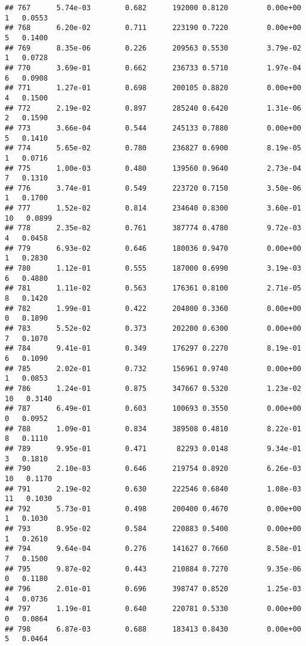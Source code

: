 \documentclass[
]{article}
\begin{document}
\begin{verbatim}
## 767      5.74e-03        0.682      192000 0.8120         0.00e+00   1   0.0553
## 768      6.20e-02        0.711      223190 0.7220         0.00e+00   5   0.1400
## 769      8.35e-06        0.226      209563 0.5530         3.79e-02   1   0.0728
## 770      3.69e-01        0.662      236733 0.5710         1.97e-04   6   0.0908
## 771      1.27e-01        0.698      200105 0.8820         0.00e+00   4   0.1500
## 772      2.19e-02        0.897      285240 0.6420         1.31e-06   2   0.1590
## 773      3.66e-04        0.544      245133 0.7880         0.00e+00   5   0.1410
## 774      5.65e-02        0.780      236827 0.6900         8.19e-05   1   0.0716
## 775      1.00e-03        0.480      139560 0.9640         2.73e-04   7   0.1310
## 776      3.74e-01        0.549      223720 0.7150         3.50e-06   1   0.1700
## 777      1.52e-02        0.814      234640 0.8300         3.60e-01  10   0.0899
## 778      2.35e-02        0.761      387774 0.4780         9.72e-03   4   0.0458
## 779      6.93e-02        0.646      180036 0.9470         0.00e+00   1   0.2830
## 780      1.12e-01        0.555      187000 0.6990         3.19e-03   6   0.4880
## 781      1.11e-02        0.563      176361 0.8100         2.71e-05   8   0.1420
## 782      1.99e-01        0.422      204800 0.3360         0.00e+00   0   0.1890
## 783      5.52e-02        0.373      202200 0.6300         0.00e+00   7   0.1070
## 784      9.41e-01        0.349      176297 0.2270         8.19e-01   6   0.1090
## 785      2.02e-01        0.732      156961 0.9740         0.00e+00   1   0.0853
## 786      1.24e-01        0.875      347667 0.5320         1.23e-02  10   0.3140
## 787      6.49e-01        0.603      100693 0.3550         0.00e+00   0   0.0952
## 788      1.09e-01        0.834      389508 0.4810         8.22e-01   8   0.1110
## 789      9.95e-01        0.471       82293 0.0148         9.34e-01   3   0.1810
## 790      2.10e-03        0.646      219754 0.8920         6.26e-03  10   0.1170
## 791      2.19e-02        0.630      222546 0.6840         1.08e-03  11   0.1030
## 792      5.73e-01        0.498      200400 0.4670         0.00e+00   1   0.1030
## 793      8.95e-02        0.584      220883 0.5400         0.00e+00   1   0.2610
## 794      9.64e-04        0.276      141627 0.7660         8.58e-01   7   0.1500
## 795      9.87e-02        0.443      210884 0.7270         9.35e-06   0   0.1180
## 796      2.01e-01        0.696      398747 0.8520         1.25e-03   4   0.0736
## 797      1.19e-01        0.640      220781 0.5330         0.00e+00   0   0.0864
## 798      6.87e-03        0.688      183413 0.8430         0.00e+00   5   0.0464

\end{verbatim}
\end{document}
